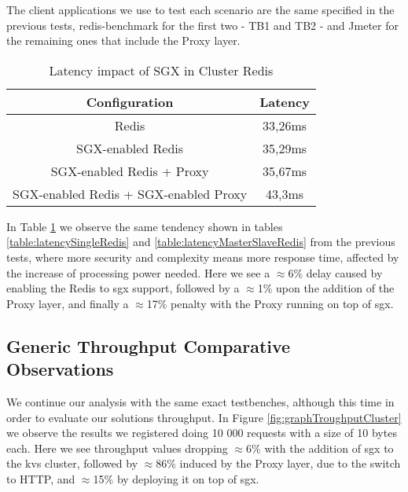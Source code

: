The client applications we use to test each scenario are the same specified in the previous tests, redis-benchmark for the first two - TB1 and TB2 - and Jmeter for the remaining ones that include the Proxy layer.

\begin{table}[ht]
	\caption{Latency impact of SGX in Cluster Redis} %
	\centering %
	\begin{tabular}{c c} %
		\hline\hline %
		\textbf{Configuration} & \textbf{Latency} \\ [0.5ex] %
		\hline
		Redis & 33,26ms\\
		\hline
		SGX-enabled Redis & 35,29ms \\
		\hline
		SGX-enabled Redis + Proxy & 35,67ms \\
		\hline %
		SGX-enabled Redis + SGX-enabled Proxy & 43,3ms\\ [1ex] %
		\hline %
	\end{tabular}
	\label{table:latencyClusterRedis} %
\end{table}

In Table \ref{table:latencyClusterRedis} we observe the same tendency shown in tables \ref{table:latencySingleRedis} and \ref{table:latencyMasterSlaveRedis} from the previous tests, where more security and complexity means more response time, affected by the increase of processing power needed.
Here we see a $\approx$6\% delay caused by enabling the Redis to \gls{sgx} support, followed by a $\approx$1\% upon the addition of the Proxy layer, and finally a $\approx$17\% penalty with the Proxy running on top of \gls{sgx}.

\subsection{Generic Throughput Comparative Observations}

We continue our analysis with the same exact testbenches, although this time in order to evaluate our solutions throughput. In Figure \ref{fig:graphTroughputCluster} we observe the results we registered doing 10 000 requests with a size of 10 bytes each. 
Here we see throughput values dropping $\approx$6\% with the addition of \gls{sgx} to the \gls{kvs} cluster, followed by $\approx$86\% induced by the Proxy layer, due to the switch to HTTP, and $\approx$15\% by deploying it on top of \gls{sgx}.

